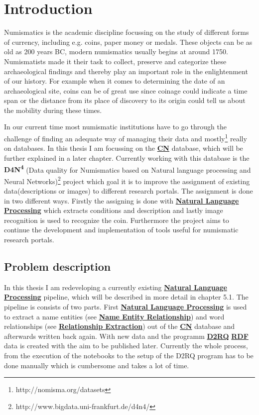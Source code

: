 \documentclass[12pt, oneside]{article}
\begin{document}
\section{Introduction} \label{introduction}
Numismatics is the academic discipline focussing on the study of different forms of currency, including e.g. coins, paper money or medals. These objects can be as old as 200 years BC, modern numismatics usually begins at around 1750. Numismatists made it their task to collect, preserve and categorize these archaeological findings and thereby play an important role in the enlightenment of our history. For example when it comes to determining the date of an archaeological site, coins can be of great use since coinage could indicate a time span or the distance from its place of discovery to its origin could tell us about the mobility during these times.

In our current time most numismatic institutions have to go through the challenge of finding an adequate way of managing their data and mostly\footnote{http://nomisma.org/datasets} really on databases. In this thesis I am focussing on the \hyperref[cn]{\textbf{CN}} database, which will be further explained in a later chapter. Currently working with this database is the \textbf{D4N\textsuperscript{4}} (Data quality for Numismatics based on Natural language processing and Neural Networks)\footnote{http://www.bigdata.uni-frankfurt.de/d4n4/} project which goal it is to improve the assignment of existing data(descriptions or images) to different research portals. The assignment is done in two different ways. Firstly the assigning is done with \hyperref[nlp]{\textbf{Natural Language Processing}} which extracts conditions and description and lastly image recognition is used to recognize the coin. Furthermore the project aims to continue the development and implementation of tools useful for numismatic research portals.
\subsection{Problem description} 
In this thesis I am redeveloping a currently existing \hyperref[nlp]{\textbf{Natural Language Processing}} pipeline, which will be described in more detail in chapter 5.1. The pipeline is consists of two parts. First \hyperref[nlp]{\textbf{Natural Language Processing}} is used to extract a name entities (see \hyperref[ner]{\textbf{Name Entity Relationship}}) and word relationships (see \hyperref[re]{\textbf{Relationship Extraction}}) out of the \hyperref[cn]{\textbf{CN}} database and afterwards written back again. With new data and the programm \hyperref[d2r]{\textbf{D2RQ}} \hyperref[rdf]{\textbf{RDF}} data is created with the aim to be published later. Currently the whole process, from the execution of the notebooks to the setup of the D2RQ program has to be done manually which is cumbersome and takes a lot of time. 
\end{document}
